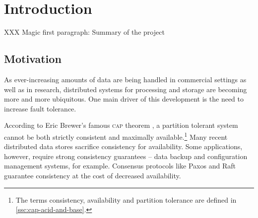 \documentclass[11pt,chapterprefix=true,toc=bibliography,numbers=noendperiod,
               footnotes=multiple,twoside]{scrreprt}
\begin{document}

\chapter{Introduction\label{ch:introduction}}


XXX Magic first paragraph: Summary of the project



\section{Motivation\label{sc:motivation}}

As ever-increasing amounts of data are being handled in commercial settings as well as in research, distributed systems for processing and storage are becoming more and more ubiquitous. One main driver of this development is the need to increase fault tolerance.

According to Eric Brewer's famous \textsc{cap} theorem \autocite{cap}, a partition tolerant system cannot be both strictly consistent and maximally available.\footnote{The terms consistency, availability and partition tolerance are defined in \autoref{ssc:cap-acid-and-base}.} Many recent distributed data stores sacrifice consistency for availability. Some applications, however, require strong consistency guarantees -- data backup and configuration management systems, for example. Consensus protocols like Paxos \autocite{paxos} and Raft \autocite{raft} guarantee consistency at the cost of decreased availability.
\end{document}
